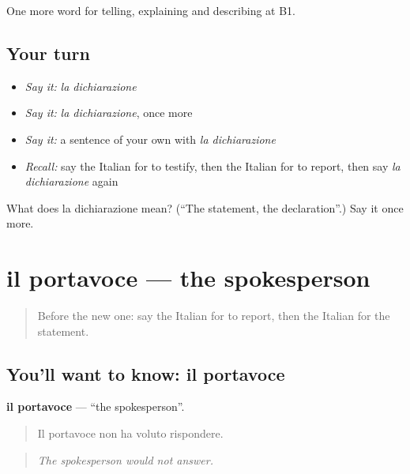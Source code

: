 \begin{grammarlens}[title={What you've built}]
One more word for telling, explaining and describing at B1.
\end{grammarlens}

\subsection*{Your turn}
\begin{itemize}
\raggedright
  \item \emph{Say it:} \emph{la dichiarazione}
  \item \emph{Say it:} \emph{la dichiarazione}, once more
  \item \emph{Say it:} a sentence of your own with \emph{la dichiarazione}
  \item \emph{Recall:} say the Italian for to testify, then the Italian for to report, then say \emph{la dichiarazione} again
\end{itemize}

\begin{tcolorbox}[breakable,colback=teal!4,colframe=teal!35!black,title={Before you move on}]
What does la dichiarazione mean? (\textquotedblleft{}The statement, the declaration\textquotedblright{}.) Say it once more.
\end{tcolorbox}
\section[il portavoce]{il portavoce — the spokesperson}

\label{lesson:IT-C285-portavoce}



\begin{quote}
Before the new one: say the Italian for to report, then the Italian for the statement.
\end{quote}

\subsection*{You'll want to know: il portavoce}
\textbf{il portavoce} — \textquotedblleft{}the spokesperson\textquotedblright{}.

\begin{quote}
Il portavoce non ha voluto rispondere.
\end{quote}

\begin{quote}
\emph{The spokesperson would not answer.}
\end{quote}

